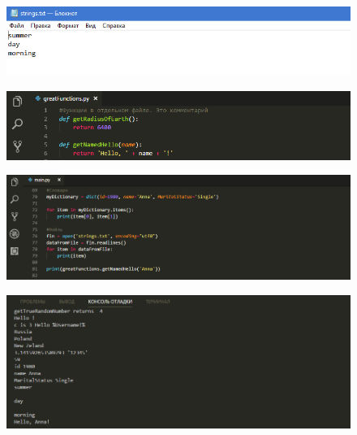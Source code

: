 \documentclass[8pt,pdf,hyperref={unicode}, xcolor=dvipsnames, fleqn]{beamer}
\begin{document}
\begin{frame}{}


\begin{figure}
	\includegraphics[width=1.0\textwidth]{Images/strings.png}
\end{figure}

\begin{figure}
	\includegraphics[width=1.0\textwidth]{Images/great.png}
\end{figure}


\end{frame}
\begin{frame}{}


\begin{figure}
	\includegraphics[width=1.0\textwidth]{Images/main3.png}
\end{figure}

\begin{figure}
	\includegraphics[width=1.0\textwidth]{Images/result.png}
\end{figure}



\end{frame}
\end{document}
